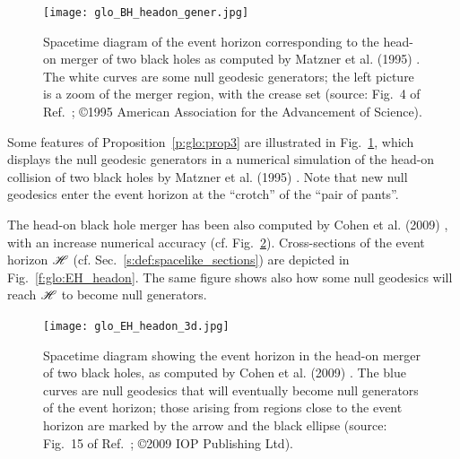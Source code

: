 \begin{figure}
\centerline{\texttt{[image: glo\_BH\_headon\_gener.jpg]}}
\caption[]{\label{f:glo:BH_headon_gener} \footnotesize
Spacetime diagram of the event horizon corresponding to the head-on merger of
two black holes as computed by Matzner et al. (1995) \cite{Matzn_al95}. The
white curves are some null geodesic generators; the left picture is a zoom of
the merger region, with the crease set
(source: Fig.~4 of Ref.~\cite{Matzn_al95}; \copyright 1995 American Association for the Advancement of Science).}
\end{figure}



Some features of Proposition~\ref{p:glo:prop3} are illustrated in Fig.~\ref{f:glo:BH_headon_gener},
which displays the null geodesic generators in a numerical simulation
of the head-on collision of two black holes by Matzner et al. (1995) \cite{Matzn_al95}.
Note that new null geodesics enter the event horizon at the ``crotch'' of the
``pair of pants''.

The head-on black hole merger has been also computed by Cohen et al. (2009) \cite{CohenPS09}, with an increase numerical accuracy (cf. Fig.~\ref{f:glo:EH_headon_3d}).
Cross-sections of the event horizon $\mathscr{H}$ (cf. Sec.~\ref{s:def:spacelike_sections})
are depicted in Fig.~\ref{f:glo:EH_headon}. The same figure shows also how
some null geodesics will reach $\mathscr{H}$ to become null generators.


\begin{figure}
\centerline{\texttt{[image: glo\_EH\_headon\_3d.jpg]}}
\caption[]{\label{f:glo:EH_headon_3d} \footnotesize
Spacetime diagram showing the event horizon in the head-on merger of
two black holes, as computed by Cohen et al. (2009) \cite{CohenPS09}.
The blue curves are null geodesics that will eventually become null generators
of the event horizon; those arising from regions close to the event horizon
are marked by the arrow and the black ellipse
(source: Fig.~15 of Ref.~\cite{CohenPS09}; \copyright 2009 IOP Publishing Ltd).}
\end{figure}

